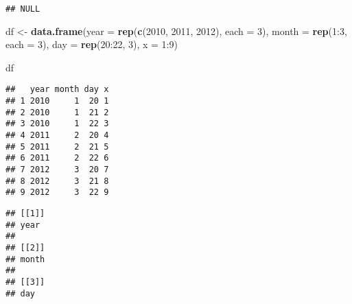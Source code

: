 \documentclass[]{book}
\newenvironment{Shaded}{\begin{snugshade}}{\end{snugshade}}
\newcommand{\KeywordTok}[1]{\textcolor[rgb]{0.13,0.29,0.53}{\textbf{{#1}}}}
\newcommand{\DataTypeTok}[1]{\textcolor[rgb]{0.13,0.29,0.53}{{#1}}}
\newcommand{\DecValTok}[1]{\textcolor[rgb]{0.00,0.00,0.81}{{#1}}}
\newcommand{\StringTok}[1]{\textcolor[rgb]{0.31,0.60,0.02}{{#1}}}
\newcommand{\NormalTok}[1]{{#1}}
\begin{document}
\begin{verbatim}
## NULL
\end{verbatim}

\begin{Shaded}
\begin{Highlighting}[]
\NormalTok{df <-}\StringTok{ }\KeywordTok{data.frame}\NormalTok{(}\DataTypeTok{year =} \KeywordTok{rep}\NormalTok{(}\KeywordTok{c}\NormalTok{(}\DecValTok{2010}\NormalTok{, }\DecValTok{2011}\NormalTok{, }\DecValTok{2012}\NormalTok{), }\DataTypeTok{each =} \DecValTok{3}\NormalTok{), }
                 \DataTypeTok{month =} \KeywordTok{rep}\NormalTok{(}\DecValTok{1}\NormalTok{:}\DecValTok{3}\NormalTok{, }\DataTypeTok{each =} \DecValTok{3}\NormalTok{), }
                 \DataTypeTok{day =} \KeywordTok{rep}\NormalTok{(}\DecValTok{20}\NormalTok{:}\DecValTok{22}\NormalTok{, }\DecValTok{3}\NormalTok{), }
                 \DataTypeTok{x =} \DecValTok{1}\NormalTok{:}\DecValTok{9}\NormalTok{)}

\NormalTok{df}
\end{Highlighting}
\end{Shaded}

\begin{verbatim}
##   year month day x
## 1 2010     1  20 1
## 2 2010     1  21 2
## 3 2010     1  22 3
## 4 2011     2  20 4
## 5 2011     2  21 5
## 6 2011     2  22 6
## 7 2012     3  20 7
## 8 2012     3  21 8
## 9 2012     3  22 9
\end{verbatim}

\begin{Shaded}
\end{Shaded}

\begin{verbatim}
## [[1]]
## year
## 
## [[2]]
## month
## 
## [[3]]
## day
\end{verbatim}

\begin{Shaded}
\end{Shaded}
\end{document}
